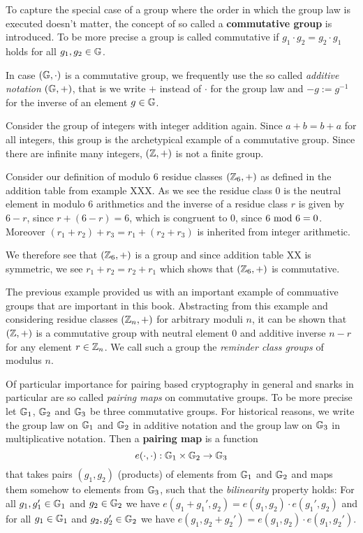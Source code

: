 To capture the special case of a group where the order in which the group law is executed doesn't matter, the concept of so called a \textbf{commutative group} is introduced. To be more precise a group is called commutative if  $g_1\cdot g_2 = g_2 \cdot g_1$ holds for all $g_1,g_2\in\mathbb{G}$. 
\begin{notation}
In case $(\mathbb{G},\cdot)$ is a commutative group, we frequently use the so called \textit{additive notation} $(\mathbb{G},+)$, that is we write $+$ instead of $\cdot$ for the group law and $-g:=g^{-1}$ for the inverse of an element $g\in\mathbb{G}$.
\end{notation}
\begin{example} Consider the group of integers with integer addition again.
Since $a+b=b+a$ for all integers, this group is the archetypical example of a commutative group. Since there are infinite many integers, $(\mathbb{Z},+)$ is not a finite group.
\end{example}
\begin{example} Consider our definition of modulo $6$ residue classes $(\mathbb{Z}_6,+)$ as defined in the addition table from example XXX. As we see the residue class $0$ is the neutral element in modulo $6$ arithmetics and the inverse of a residue class $r$ is given by $6-r$, since $r+(6-r)=6$, which is congruent to $0$, since $6 \text{ mod } 6=0$. Moreover $(r_1+r_2)+r_3=r_1+(r_2+r_3)$ is inherited from integer arithmetic.  

We therefore see that $(\mathbb{Z}_6,+)$ is a group and since addition table XX is symmetric, we see $r_1+r_2 = r_2+r_1$ which shows that $(\mathbb{Z}_6,+)$ is commutative. 
\end{example}
The previous example provided us with an important example of commuative groups that are important in this book. Abstracting from this example and considering residue classes $(\mathbb{Z}_n,+)$ for arbitrary moduli $n$, it can be shown that $(\mathbb{Z},+)$ is a commutative group with neutral element $0$ and additive inverse $n-r$ for any element $r\in\mathbb{Z}_n$. We call such a group the \textit{reminder class groups} of modulus $n$.

Of particular importance for pairing based cryptography in general and snarks in particular are so called \textit{pairing maps} on commutative groups. To be more precise let $\mathbb{G}_1$, $\mathbb{G}_2$ and $\mathbb{G}_3$ be three commutative groups. For historical reasons, we write the group law on $\mathbb{G}_1$ and $\mathbb{G}_2$ in additive notation and the group law on $\mathbb{G}_3$ in multiplicative notation. Then a \textbf{pairing map} is a function
\begin{equation}
e(\cdot,\cdot): \mathbb{G}_1 \times \mathbb{G}_2 \to \mathbb{G}_3
\end{equation}
that takes pairs $(g_1,g_2)$ (products) of elements from $\mathbb{G}_1$ and $\mathbb{G}_2$ and maps them somehow to elements from $\mathbb{G}_3$, such that the \textit{bilinearity} property holds: For all $g_1,g_1'\in \mathbb{G}_1$ and $g_2\in \mathbb{G}_2$ we have $e(g_1+ g_1',g_2)= e(g_1,g_2)\cdot e(g_1',g_2)$ and for all $g_1\in \mathbb{G}_1$ and $g_2, g_2'\in \mathbb{G}_2$ we have $e(g_1,g_2+ g_2')= e(g_1,g_2)\cdot e(g_1,g_2')$. 


